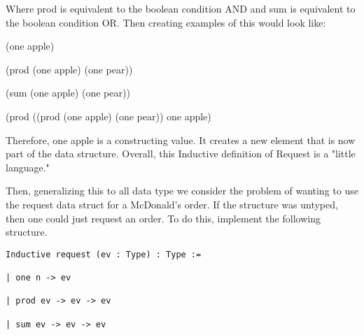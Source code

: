 \documentclass[10pt]{article}
\begin{document}
Where prod is equivalent to the boolean condition AND and sum is equivalent to the boolean condition OR. Then creating examples of this would look like: 


(one apple)

(prod (one apple) (one pear))

(sum (one apple) (one pear))

(prod ((prod (one apple) (one pear)) one apple)


Therefore, one apple is a constructing value. It creates a new element that is now part of the data structure. Overall, this Inductive definition of Request is a "little language."

Then, generalizing this to all data type we consider the problem of wanting to use the request data struct for a McDonald's order. If the structure was untyped, then one could just request an order. To do this, implement the following structure. 

\begin{verbatim}
Inductive request (ev : Type) : Type :=

| one n -> ev

| prod ev -> ev -> ev

| sum ev -> ev -> ev

\end{verbatim}
\end{document}
